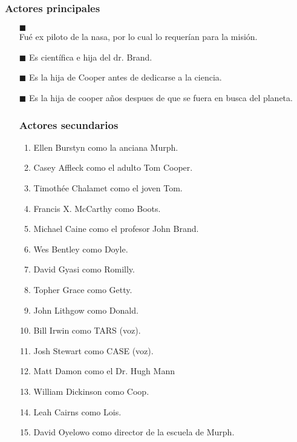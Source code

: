 \documentclass[a5paper, 11pt]{article}
\begin{document}
  \subsubsection{Actores principales}
  \begin{itemize}
   \item[$\blacksquare$] \\
   Fué ex piloto de la nasa, por lo cual lo requerían para la misión.
   
   \item[$\blacksquare$] 
   Es científica e hija del dr. Brand.
   \item[$\blacksquare$]
   Es la hija de Cooper antes de dedicarse a la ciencia.
   \item[$\blacksquare$] 
   Es la hija de cooper años despues de que se fuera en busca del planeta.
  
  \subsubsection{Actores secundarios} 
  
  \begin{enumerate}
   \item Ellen Burstyn como la anciana Murph.
   \item Casey Affleck como el adulto Tom Cooper.
   \item Timothée Chalamet como el joven Tom.
   \item Francis X. McCarthy como Boots.
   \item Michael Caine como el profesor John Brand.
   \item Wes Bentley como Doyle.
   \item David Gyasi como Romilly.
   \item Topher Grace como Getty.
   \item John Lithgow como Donald.
   \item Bill Irwin como TARS (voz).
   \item Josh Stewart como CASE (voz).
   \item Matt Damon como el Dr. Hugh Mann
   \item William Dickinson como Coop.
   \item Leah Cairns como Lois.
   \item David Oyelowo como director de la escuela de Murph.
  \end{enumerate}
  

\end{itemize}
\end{document}
